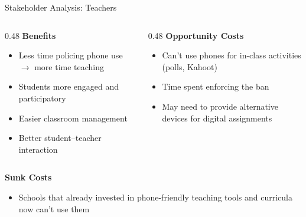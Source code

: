 \documentclass[9pt,english,aspectratio=169]{beamer}
\begin{document}
\begin{frame}{Stakeholder Analysis: Teachers}

  \begin{columns}[T]
    \begin{column}{0.48\textwidth}
      \textbf{\textcolor{green!60!black}{Benefits}}
      \begin{itemize}\small
        \item Less time policing phone use $\rightarrow$ more time teaching
        \item Students more engaged and participatory
        \item Easier classroom management
        \item Better student--teacher interaction
      \end{itemize}
    \end{column}
    \begin{column}{0.48\textwidth}
      \textbf{\textcolor{vermillion}{Opportunity Costs}}
      \begin{itemize}\small
        \item Can't use phones for in-class activities (polls, Kahoot)
        \item Time spent enforcing the ban
        \item May need to provide alternative devices for digital assignments
      \end{itemize}
    \end{column}
  \end{columns}

  \vspace{0.6em}
  \textbf{Sunk Costs}
  \begin{itemize}\small
    \item Schools that already invested in phone-friendly teaching tools and curricula now can't use them
  \end{itemize}

\end{frame}
\end{document}

